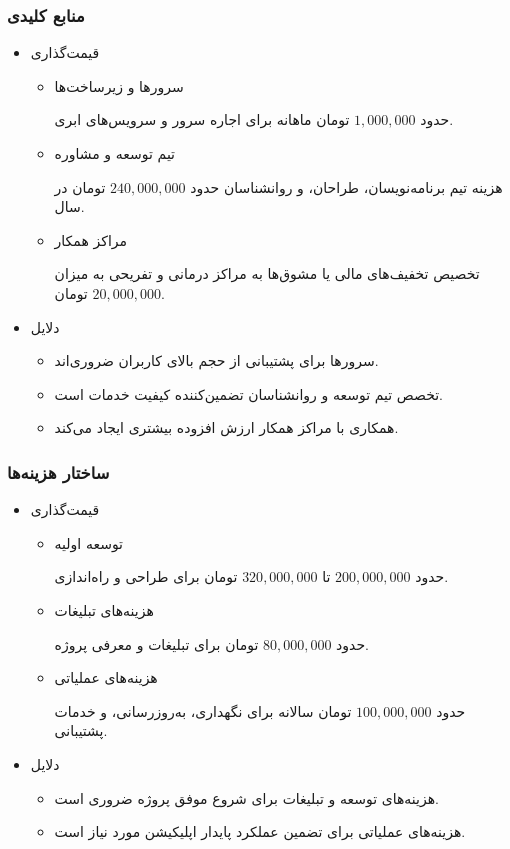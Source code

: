 \documentclass[dvipsnames, svgnames, x11names, 11pt]{article}
\begin{document}
\subsubsection{منابع کلیدی}
  \begin{itemize}
\item 
قیمت‌گذاری
\begin{itemize}
\item 
سرورها و زیرساخت‌ها

حدود
$1,000,000$
تومان ماهانه برای اجاره سرور و سرویس‌های ابری.

\item 
تیم توسعه و مشاوره

هزینه تیم برنامه‌نویسان، طراحان، و روانشناسان حدود
$240,000,000$
تومان در سال.

\item 
مراکز همکار

تخصیص تخفیف‌های مالی یا مشوق‌ها به مراکز درمانی و تفریحی به میزان
$20,000,000$
تومان.
\end{itemize}

\item 
دلایل
\begin{itemize}
\item 
سرورها برای پشتیبانی از حجم بالای کاربران ضروری‌اند.

\item 
تخصص تیم توسعه و روانشناسان تضمین‌کننده کیفیت خدمات است.

\item 
همکاری با مراکز همکار ارزش افزوده بیشتری ایجاد می‌کند.
\end{itemize}
\end{itemize}

\subsubsection{ساختار هزینه‌ها}
\begin{itemize}
\item 
قیمت‌گذاری
\begin{itemize}
\item 
توسعه اولیه

حدود
$200,000,000$
تا
$320,000,000$
تومان برای طراحی و راه‌اندازی.

\item 
هزینه‌های تبلیغات

حدود
$80,000,000$
تومان برای تبلیغات و معرفی پروژه.

\item 
هزینه‌های عملیاتی

حدود
$100,000,000$
تومان سالانه برای نگهداری، به‌روزرسانی، و خدمات پشتیبانی.
\end{itemize}

\item 
دلایل
\begin{itemize}
\item
هزینه‌های توسعه و تبلیغات برای شروع موفق پروژه ضروری است.
\item 
هزینه‌های عملیاتی برای تضمین عملکرد پایدار اپلیکیشن مورد نیاز است.
\end{itemize}
\end{itemize}
\end{document}

